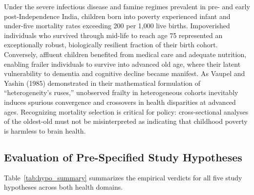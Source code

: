 Under the severe infectious disease and famine regimes prevalent in pre- and early post-Independence India, children born into poverty experienced infant and under-five mortality rates exceeding 200 per 1,000 live births. Impoverished individuals who survived through mid-life to reach age 75 represented an exceptionally robust, biologically resilient fraction of their birth cohort. Conversely, affluent children benefited from medical care and adequate nutrition, enabling frailer individuals to survive into advanced old age, where their latent vulnerability to dementia and cognitive decline became manifest. As Vaupel and Yashin (1985) demonstrated in their mathematical formulation of ``heterogeneity's ruses,'' unobserved frailty in heterogeneous cohorts inevitably induces spurious convergence and crossovers in health disparities at advanced ages. Recognizing mortality selection is critical for policy: cross-sectional analyses of the oldest-old must not be misinterpreted as indicating that childhood poverty is harmless to brain health.

\subsection{Evaluation of Pre-Specified Study Hypotheses}
Table~\ref{tab:hypo_summary} summarizes the empirical verdicts for all five study hypotheses across both health domains.

